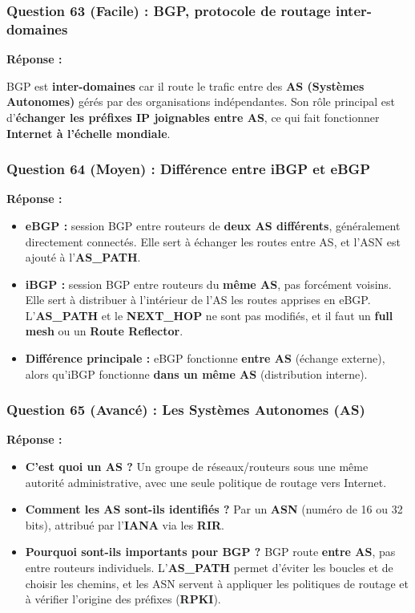 \documentclass[12pt,a4paper]{article}
\newcommand{\reponse}{\textbf{Réponse :}\par}
\begin{document}
\subsubsection*{Question 63 (Facile) : BGP, protocole de routage inter-domaines}

\reponse
BGP est \textbf{inter-domaines} car il route le trafic entre des
\textbf{AS (Systèmes Autonomes)} gérés par des organisations
indépendantes. Son rôle principal est d'\textbf{échanger les préfixes
IP joignables entre AS}, ce qui fait fonctionner \textbf{Internet à
l'échelle mondiale}.

\subsubsection*{Question 64 (Moyen) : Différence entre iBGP et eBGP}

\reponse
\begin{itemize}
    \item \textbf{eBGP :} session BGP entre routeurs de \textbf{deux AS
    différents}, généralement directement connectés. Elle sert à
    échanger les routes entre AS, et l'ASN est ajouté à
    l'\textbf{AS\_PATH}.
    \item \textbf{iBGP :} session BGP entre routeurs du \textbf{même AS},
    pas forcément voisins. Elle sert à distribuer à l'intérieur de
    l'AS les routes apprises en eBGP. L'\textbf{AS\_PATH} et le
    \textbf{NEXT\_HOP} ne sont pas modifiés, et il faut un
    \textbf{full mesh} ou un \textbf{Route Reflector}.
    \item \textbf{Différence principale :} eBGP fonctionne
    \textbf{entre AS} (échange externe), alors qu'iBGP fonctionne
    \textbf{dans un même AS} (distribution interne).
\end{itemize}

\subsubsection*{Question 65 (Avancé) : Les Systèmes Autonomes (AS)}

\reponse
\begin{itemize}
    \item \textbf{C'est quoi un AS ?}
    Un groupe de réseaux/routeurs sous une même autorité
    administrative, avec une seule politique de routage vers Internet.
    \item \textbf{Comment les AS sont-ils identifiés ?}
    Par un \textbf{ASN} (numéro de 16 ou 32 bits), attribué par
    l'\textbf{IANA} via les \textbf{RIR}.
    \item \textbf{Pourquoi sont-ils importants pour BGP ?}
    BGP route \textbf{entre AS}, pas entre routeurs individuels.
    L'\textbf{AS\_PATH} permet d'éviter les boucles et de choisir les
    chemins, et les ASN servent à appliquer les politiques de routage
    et à vérifier l'origine des préfixes (\textbf{RPKI}).
\end{itemize}
\end{document}
